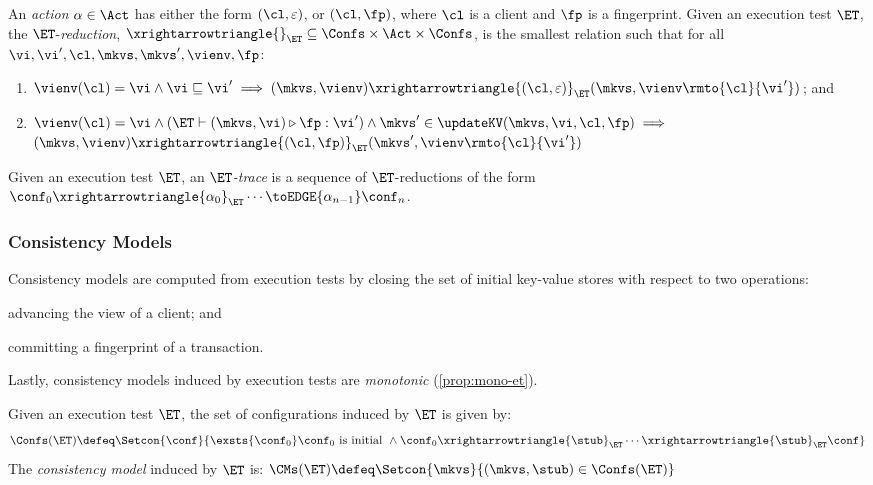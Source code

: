 \begin{definition}[$\ET$-reductions]
\label{def:reduction}
An \emph{action} $\alpha \in \Act$ has either the form $(\cl, \varepsilon)$, 
or $(\cl, \fp)$, 
where $\cl$ is a client and $\fp$ is a fingerprint. 
Given an execution test $\ET$, the $\ET$-\emph{reduction}, 
$\xrightarrowtriangle{}_{\ET} \subseteq \Confs \times \Act \times \Confs$, 
is the smallest relation such that for all $\vi, \vi', \cl, \mkvs, \mkvs', \vienv, \fp$:
\begin{enumerate}
	\item 
    $
    \vienv(\cl) = \vi 
    \wedge \vi \sqsubseteq \vi' 
    \implies (\mkvs, \vienv) \xrightarrowtriangle{(\cl, \varepsilon)}_{\ET} 
    (\mkvs, \vienv\rmto{\cl}{\vi'})$; and
	\item 
    $\vienv(\cl) = \vi
        \wedge (\ET \vdash (\mkvs, \vi) \triangleright \fp: \vi')  
        \wedge \mkvs' \in \updateKV(\mkvs, \vi, \cl, \fp) \implies
	$  \\
	\phantom{a} \hfill 
	$(\mkvs, \vienv) \xrightarrowtriangle{(\cl, \fp)}_{\ET} (\mkvs', \vienv\rmto{\cl}{\vi'})$
\end{enumerate}
%
Given an execution test $\ET$, an \emph{$\ET$-trace} is a sequence of $\ET$-reductions of the form $\conf_{0} \xrightarrowtriangle{\alpha_{0}}_{\ET} \cdots 
\toEDGE{\alpha_{n-1}} \conf_{n}$.
\end{definition}
%
%
%
%
\subsubsection{Consistency Models}
Consistency models are computed from execution tests by closing the set of initial key-value stores with respect to two operations: 
\begin{enumerate*}[label=(\arabic*)]
	\item advancing the view of a client; and 
	\item committing a fingerprint of a transaction. 
\end{enumerate*}
Lastly, consistency models induced by execution tests are \emph{monotonic} (\cref{prop:mono-et}).
%
%
\begin{definition}
\label{def:cm}
Given an execution test $\ET$, the set of configurations induced by $\ET$ is given by:
\[
\Confs(\ET) \defeq \Setcon{ \conf}{ \exsts{\conf_0} \conf_0 \text{ is initial } \wedge \conf_0 \xrightarrowtriangle{\stub}_{\ET} \cdots \xrightarrowtriangle{\stub}_{\ET} \conf }
\]
The \emph{consistency model} induced by $\ET$ is:
\( 
\CMs(\ET) \defeq \Setcon{ \mkvs }{ (\mkvs, \stub) \in \Confs(\ET) }
\)
\end{definition}




